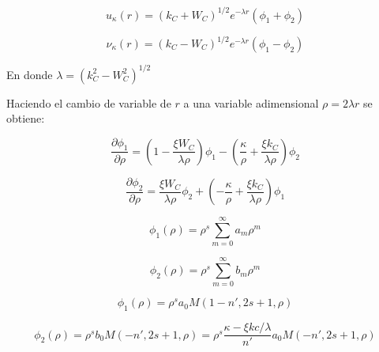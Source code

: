 \documentclass{beamer}
\begin{document}
\begin{frame}
\begin{equation}\label{eq:cdv}
u_{\kappa}(r) = (k_C + W_C)^{1/2} e^{-\lambda r}(\phi_1 + \phi_2)
\end{equation}

\begin{equation}
\nu_{\kappa}(r) = (k_C - W_C )^{1/2} e^{-\lambda r} (\phi_1 - \phi_2)
\end{equation}

En donde $\lambda = (k_C^2 - W_C^2)^{1/2}$
\end{frame}



\begin{frame}
Haciendo el cambio de variable de $r$ a una variable adimensional $\rho = 2 \lambda r$
se obtiene:

\begin{equation}\label{eq:sol1}
\dfrac{\partial \phi_1}{\partial \rho} = \left( 1-\dfrac{\xi W_C}{\lambda  \rho} \right) 
\phi_1 - \left( \dfrac{\kappa}{\rho} + \dfrac{\xi k_C}{\lambda \rho}  \right)\phi_2
\end{equation}

\begin{equation}\label{eq:sol2}
\dfrac{\partial \phi_2}{\partial \rho} = \dfrac{\xi W_C}{\lambda  \rho} \phi_2 
+ \left( -\dfrac{\kappa}{\rho} + \dfrac{\xi k_C}{\lambda \rho}  \right)\phi_1
\end{equation}
\end{frame}

\begin{frame}
\begin{equation}\label{eq:phi1}
\phi_1(\rho) = \rho^s \sum \limits_{m=0}^{\infty} a_m \rho^m
\end{equation}


\begin{equation} \label{eq:phi2}
\phi_2(\rho) = \rho^s \sum \limits_{m=0}^{\infty} b_m \rho^m
\end{equation}

\end{frame}

\begin{frame}
\begin{equation}\label{eq:sol1}
\phi_1(\rho) = 	\rho^s a_0 M(1-n',2s+1,\rho)
\end{equation}

\begin{equation}\label{eq:sol2}
\phi_2(\rho) = \rho^s b_0 M(-n',2s+1,\rho) = \rho^s \dfrac{\kappa - \xi kc / \lambda}{n'} a_0 M(-n',2s+1,\rho)
\end{equation}
\end{frame}
\end{document}
